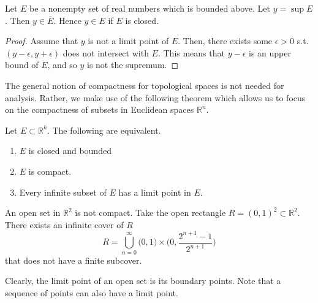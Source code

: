   \begin{theorem}
    Let $E$ be a nonempty set of real numbers which is bounded above. Let $y = \sup{E}$. Then $y \in \overline{E}$. Hence $y \in E$ if $E$ is closed. 
  \end{theorem}
  \begin{proof}
    Assume that $y$ is not a limit point of $E$. Then, there exists some $\epsilon > 0$ s.t. $(y - \epsilon, y + \epsilon)$ does not intersect with $E$. This means that $y - \epsilon$ is an upper bound of $E$, and so $y$ is not the supremum. 
  \end{proof}

  The general notion of compactness for topological spaces is not needed for analysis. Rather, we make use of the following theorem which allows us to focus on the compactness of subsets in Euclidean spaces $\mathbb{R}^n$. 

  \begin{theorem}
    Let $E \subset \mathbb{R}^k$. The following are equivalent. 
    \begin{enumerate}
      \item $E$ is closed and bounded 
      \item $E$ is compact. 
      \item Every infinite subset of $E$ has a limit point in $E$. 
    \end{enumerate}
  \end{theorem}

  \begin{example}
    An open set in $\mathbb{R}^2$ is not compact. Take the open rectangle $ R = (0,1)^2 \subset \mathbb{R}^2$. There exists an infinite cover of $R$
    \[R = \bigcup_{n=0}^\infty \big(0,1\big) \times \bigg( 0, \frac{ 2^{n+1} - 1}{2^{n+1}} \bigg) \]
    that does not have a finite subcover. 
  \end{example}

  Clearly, the limit point of an open set is its boundary points. Note that a sequence of points can also have a limit point. 

